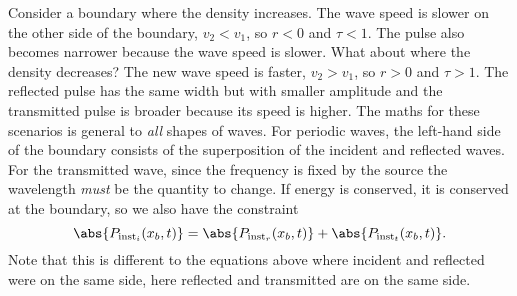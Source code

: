\documentclass[../classical_mechanics.tex]{subfiles}
\begin{document}
        Consider a boundary where the density increases.
        The wave speed is slower on the other side of the boundary, $v_2<v_1$, so $r<0$ and $\tau<1$.
        The pulse also becomes narrower because the wave speed is slower.
        What about where the density decreases?
        The new wave speed is faster, $v_2>v_1$, so $r>0$ and $\tau>1$.
        The reflected pulse has the same width but with smaller amplitude and the transmitted pulse is broader because its speed is higher.
        The maths for these scenarios is general to \textit{all} shapes of waves.
        For periodic waves, the left-hand side of the boundary consists of the superposition of the incident and reflected waves.
        For the transmitted wave, since the frequency is fixed by the source the wavelength \textit{must} be the quantity to change.
        If energy is conserved, it is conserved at the boundary, so we also have the constraint
        \begin{equation}
            \abs{P_{\text{inst}_i}(x_b,t)}=\abs{P_{\text{inst}_r}(x_b,t)}+\abs{P_{\text{inst}_t}(x_b,t)}.
        \end{equation}
        Note that this is different to the equations above where incident and reflected were on the same side, here reflected and transmitted are on the same side.
\end{document}
